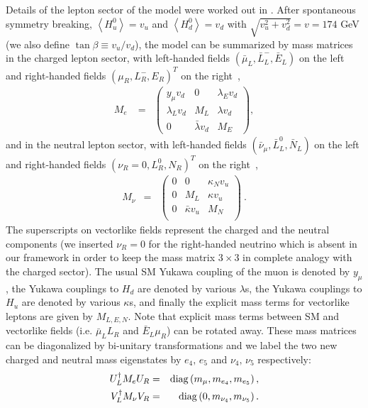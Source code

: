 Details of the lepton sector of the model were worked out in .
After spontaneous symmetry breaking, $\left< H_u^0 \right> = v_u$ and $\left< H_d^0 \right> = v_d$ with $\sqrt{v_u^2 + v_d^2} = v = 174$ GeV (we also define $\tan \beta \equiv v_u / v_d$), the model can be summarized by mass matrices in the charged lepton sector, with left-handed fields $( \bar \mu_{L}, \bar L^-_L, \bar E_L )$ on the left and right-handed fields $( \mu_{R} , L^-_R, 
 E_R)^T$ on the right~\cite{Dermisek:2013gta},
\begin{eqnarray}
M_e \;  
%
&=& 
%
\begin{pmatrix}
 y_\mu v_d & 0 &  \lambda_E v_d\\
  \lambda_L v_d & M_L &  \lambda v_d\\
 0 & \bar \lambda v_d & M_E 
\end{pmatrix},
\end{eqnarray}
%
and in the neutral lepton sector, with left-handed fields $( \bar \nu_\mu , \bar{L}_L^0 , \bar N_L)$ on the left and right-handed fields $( \nu_R = 0 ,
L_R^0 ,
N_R)^T$ on the right~\cite{Dermisek:2015oja},
%
\begin{eqnarray}
M_\nu  &=& 
\left( 
\begin{array}{ccc}
0 & 0 & \kappa_N v_u \\
0 & M_L & \kappa v_u \\
0 & \bar \kappa v_u & M_N \\
\end{array}
\right)~.
\label{eq:mm}
\end{eqnarray}
%
The superscripts on vectorlike fields represent the charged and the neutral components (we  inserted $\nu_R = 0$ for the  right-handed neutrino which is absent in our framework in order to keep  the mass matrix $3\times3$ in complete analogy with the charged sector).  The usual SM Yukawa coupling of the muon is denoted by $y_\mu$, the Yukawa couplings to $H_d$ are denoted by various $\lambda$s, the Yukawa couplings to $H_u$ are denoted by various $\kappa$s, and finally the explicit mass terms for vectorlike  leptons are given by $M_{L,E,N}$. Note that explicit mass terms between SM and vectorlike fields (i.e. $\bar \mu_L L_R$ and $\bar E_L \mu_R$) can be rotated away. These mass matrices can be diagonalized by bi-unitary transformations and we label the two new charged and neutral mass eigenstates by $e_4, \, e_5$ and $\nu_4, \, \nu_5$ respectively:
%
\begin{eqnarray}
U_L^\dagger M_e U_R &=& {\rm diag}
\left(
 m_\mu,  m_{e_4} ,  m_{e_5}
\right), \\
V_L^\dagger M_\nu V_R &= &  {\rm diag} 
\left(0, m_{\nu_4} , m_{\nu_5}
\right).
\label{eq:unitary}
\end{eqnarray}
%

